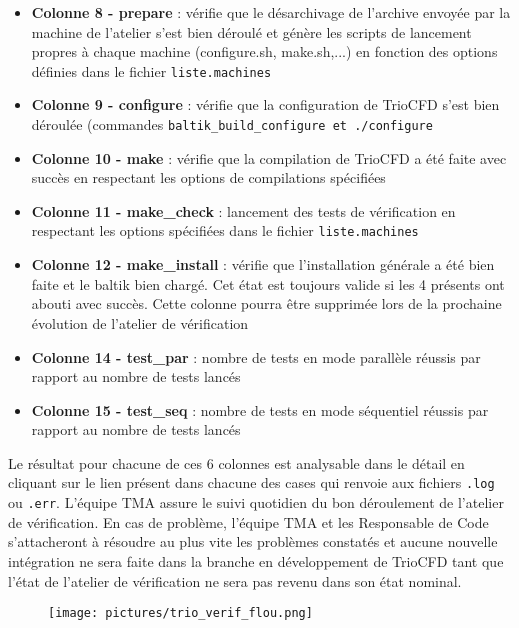 \begin{itemize}[label=$\Rightarrow$, font=\LARGE]
   \item \textbf{Colonne 8 - prepare} : vérifie que le désarchivage de l'archive envoyée par la machine de l'atelier s'est bien déroulé et génère les scripts de lancement propres à chaque machine (configure.sh, make.sh,...) en fonction des options définies dans le fichier \texttt{liste.machines}
   \item \textbf{Colonne 9 - configure} : vérifie que la configuration de TrioCFD s'est bien déroulée (commandes \texttt{baltik\_build\_configure et \texttt{./configure}}
   \item \textbf{Colonne 10 - make} : vérifie que la compilation de TrioCFD a été faite avec succès en respectant les options de compilations spécifiées
   \item \textbf{Colonne 11 - make\_check} : lancement des tests de vérification en respectant les options spécifiées dans le fichier \texttt{liste.machines}
   \item \textbf{Colonne 12 - make\_install} : vérifie que l'installation générale a été bien faite et le baltik bien chargé. Cet état est toujours valide si les 4 présents ont abouti avec succès. Cette colonne pourra être supprimée lors de la prochaine évolution de l'atelier de vérification
   \item \textbf{Colonne 14 - test\_par} : nombre de tests en mode parallèle réussis par rapport au nombre de tests lancés
   \item \textbf{Colonne 15 - test\_seq} : nombre de tests en mode séquentiel réussis par rapport au nombre de tests lancés
\end{itemize}

Le résultat pour chacune de ces 6 colonnes est analysable dans le détail en cliquant sur le lien présent dans chacune des cases qui renvoie aux fichiers \texttt{.log} ou \texttt{.err}. L'équipe TMA assure le suivi quotidien du bon déroulement de l'atelier de vérification. En cas de problème, l'équipe TMA et les Responsable de Code s'attacheront à résoudre au plus vite les problèmes constatés et aucune nouvelle intégration ne sera faite dans la branche en développement de TrioCFD tant que l'état de l'atelier de vérification ne sera pas revenu dans son état nominal. 
\newpage

\begin{figure}[H]
   \centering
   \texttt{[image: pictures/trio\_verif\_flou.png]}
   \vspace*{0.2cm}
\end{figure}




